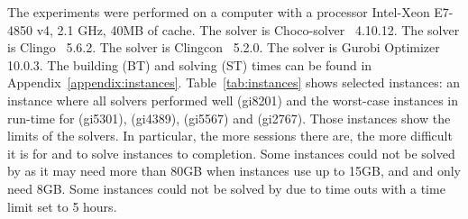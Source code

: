 


The experiments were performed on a computer with a processor Intel-Xeon E7-4850 v4, 2.1 GHz, 40MB of cache.
The \CP{} solver is Choco-solver~\cite{2022_chocosolver} 4.10.12.
The \ASP{} solver is Clingo~\cite{2019_clingo} 5.6.2.
The \CASP{} solver is Clingcon~\cite{2018_casp} 5.2.0.
The \MIP{} solver is Gurobi Optimizer~\cite{2023_gurobi} 10.0.3.
%
The building (BT) and solving (ST) times can be found in Appendix~\ref{appendix:instances}.
Table~\ref{tab:instances} shows selected instances:
an instance where all solvers performed well (gi8201) and the worst-case instances in run-time for \CP{} (gi5301), \ASP{} (gi4389), \CASP{} (gi5567) and \MIP{} (gi2767).
Those instances show the limits of the solvers.
In particular, the more sessions there are, the more difficult it is for \ASP{} and \MIP{} to solve instances to completion.
%
Some instances could not be solved by \ASP{} as it may need more than 80GB when \MIP{} instances use up to 15GB, and \CP{} and \CASP{} only need 8GB.
Some instances could not be solved by \MIP{} due to time outs with a time limit set to 5 hours.


